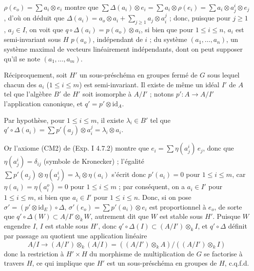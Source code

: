 \documentclass[11pt,a4paper]{article}
\begin{document}
$\rho(e_{o}) = \sum a_{i} \otimes e_{i}$ montre que
$\sum \Delta(a_{i}) \otimes e_{i} = \sum a_{i} \otimes \rho(e_{i})
= \sum a_{i} \otimes a^{i}_{j} \otimes e_{j}$, d'où on déduit que
$\Delta(a_{i}) = a_{o} \otimes a_{i} + \sum_{j \geqslant 1}
a_{j} \otimes a^{j}_{i}$ ; donc, puisque pour $j \geqslant 1$,
$a_{j} \in I$, on voit que
$q \circ \Delta(a_{i}) = p(a_{o}) \otimes a_{i}$, si bien que pour
$1 \leqslant i \leqslant n$, $a_{i}$ est semi-invariant sous $H$
\struck{\ill{}}  $p(a_{o})$, indépendant
de $i$ ;   du
système $(a_{1}, \dots, a_{n})$,  un système
maximal de vecteurs linéairement indépendants, dont on peut supposer qu'il
se note $(a_{1}, \dots, a_{m})$. 

Réciproquement, soit $H'$ un sous-préschéma en groupes fermé de $G$ sous
lequel chacun des $a_{i}$ ($1 \leqslant i \leqslant m$) est semi-invariant.
 Il existe de même un idéal $I'$ de $A$ tel que
l'algèbre $B'$ de $H'$ soit isomorphe à $A/I'$ ; notons
$p' : A \to A/I'$ l'application canonique, et
$q' = p' \otimes \mathrm{id}_{A}$.

Par hypothèse, pour $1 \leqslant i \leqslant m$, il existe
$\lambda_{i} \in B'$ tel que
$q' \circ \Delta(a_{i}) = \sum p'(a_{j}) \otimes a^{j}_{i}
= \lambda_{i} \otimes a_{i}$.

Or l'axiome (CM2) de (Exp. I 4.7.2) montre que
$e_{i} = \sum \eta(a^{i}_{j})\, e_{j}$, donc que
$\eta(a^{i}_{j}) = \delta_{ij}$ (symbole de Kronecker) ; l'égalité
$\sum p'(a_{j}) \otimes \eta(a^{i}_{j}) = \lambda_{i} \otimes \eta(a_{i})$
s'écrit donc $p'(a_{i}) = 0$ pour $1 \leqslant i \leqslant m$, car
$\eta(a_{i}) = \eta(a^{o}_{i}) = 0$ pour $1 \leqslant i \leqslant m$ ; par
conséquent, on a $a_{i} \in I'$ pour $1 \leqslant i \leqslant m$, si bien
que $a_{i} \in I'$ pour $1 \leqslant i \leqslant n$. Donc, si on pose
$\sigma' = (p' \otimes \mathrm{id}_{E}) \circ \Delta$,
$\sigma'(e_{o}) = \sum p'(a_{i}) \otimes e_{i}$ est proportionnel à
$e_{o}$, de sorte que
$q' \circ \Delta(W) \subset A/I' \otimes_{k} W$, autrement dit que $W$ est
stable sous $H'$. Puisque $W$ engendre  $I$, $I$ est stable
sous $H'$, donc
$q' \circ \Delta(I) \subset (A/I') \otimes_{k} I$, et
$q' \circ \Delta$ définit par passage au quotient une application linéaire
\[
A/I \longrightarrow (A/I') \otimes_{k} (A/I)
= ((A/I') \otimes_{k} A) / ((A/I') \otimes_{k} I)
\]
donc \struck{\ill{}} la restriction à $H' \times H$ du morphisme de
multiplication de $G$ se factorise à travers $H$, ce qui implique que $H'$
est \struck{\ill{}} un sous-préschéma en groupes de $H$, c.q.f.d.
\end{document}
